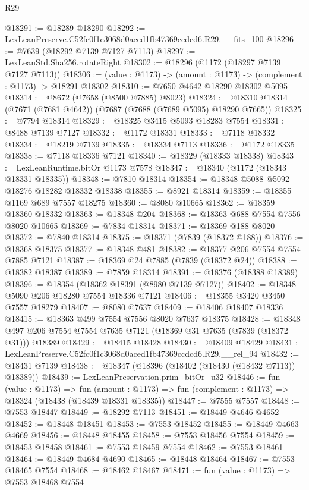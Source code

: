 \begin{lexlean}{R29}
\begin{coremodule}
@18291 := @18289 @18290
@18292 := LexLeanPreserve.C52fc0f1c3068d0aced1fb47369ccdcd6.R29.__fits_100
@18296 := @7639 (@18292 @7139 @7127 @7113)
@18297 := LexLeanStd.Sha256.rotateRight
@18302 := @18296 (@1172 (@18297 @7139 @7127 @7113))
@18306 := (value : @1173) -> (amount : @1173) -> (complement : @1173) -> @18291 @18302
@18310 := @7650 @4642 @18290 @18302 @5095
@18314 := @8672 (@7658 (@8500 @7885) @8023)
@18324 := @18310 @18314 (@7671 (@7681 @4642)) (@7687 (@7688 (@7689 @5095) @18290 @7665))
@18325 := @7794 @18314
@18329 := @18325 @3415 @5093 @18283 @7554
@18331 := @8488 @7139 @7127
@18332 := @1172 @18331
@18333 := @7118 @18332
@18334 := @18219 @7139
@18335 := @18334 @7113
@18336 := @1172 @18335
@18338 := @7118 @18336 @7121
@18340 := @18329 (@18333 @18338)
@18343 := LexLeanRuntime.bitOr @1173 @7578
@18347 := @18340 (@1172 (@18343 @18331 @18335))
@18348 := @7810 @18314
@18354 := @18348 @5088 @5092 @18276 @18282 @18332 @18338
@18355 := @8921 @18314
@18359 := @18355 @1169 @689 @7557 @18275
@18360 := @8080 @10665
@18362 := @18359 @18360 @18332
@18363 := @18348 @204
@18368 := @18363 @688 @7554 @7556 @8020 @10665
@18369 := @7834 @18314
@18371 := @18369 @188 @8020
@18372 := @7840 @18314
@18375 := @18371 (@7839 (@18372 @188))
@18376 := @18368 @18375
@18377 := @18348 @481
@18382 := @18377 @206 @7554 @7554 @7885 @7121
@18387 := @18369 @24 @7885 (@7839 (@18372 @24))
@18388 := @18382 @18387
@18389 := @7859 @18314
@18391 := @18376 (@18388 @18389)
@18396 := @18354 (@18362 @18391 (@8980 @7139 @7127))
@18402 := @18348 @5090 @206 @18280 @7554 @18336 @7121
@18406 := @18355 @3420 @3450 @7557 @18279
@18407 := @8080 @7637
@18409 := @18406 @18407 @18336
@18415 := @18363 @499 @7554 @7556 @8020 @7637 @18375
@18428 := @18348 @497 @206 @7554 @7554 @7635 @7121 (@18369 @31 @7635 (@7839 (@18372 @31))) @18389
@18429 := @18415 @18428
@18430 := @18409 @18429
@18431 := LexLeanPreserve.C52fc0f1c3068d0aced1fb47369ccdcd6.R29.__rel_94
@18432 := @18431 @7139
@18438 := @18347 (@18396 (@18402 (@18430 (@18432 @7113)) @18389))
@18439 := LexLeanPreservation.prim_bitOr_u32
@18446 := fun (value : @1173) =>
  fun (amount : @1173) => fun (complement : @1173) => @18324 (@18438 (@18439 @18331 @18335))
@18447 := @7555 @7557
@18448 := @7553 @18447
@18449 := @18292 @7113
@18451 := @18449 @4646 @4652
@18452 := @18448 @18451
@18453 := @7553 @18452
@18455 := @18449 @4663 @4669
@18456 := @18448 @18455
@18458 := @7553 @18456 @7554
@18459 := @18453 @18458
@18461 := @7553 @18459 @7554
@18462 := @7553 @18461
@18464 := @18449 @4684 @4690
@18465 := @18448 @18464
@18467 := @7553 @18465 @7554
@18468 := @18462 @18467
@18471 := fun (value : @1173) => @7553 @18468 @7554

\end{coremodule}
\end{lexlean}
